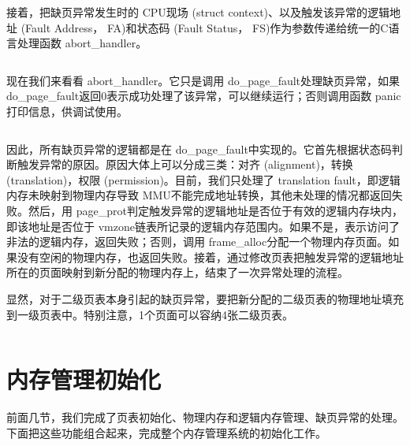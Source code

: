\documentclass[main.tex]{subfiles}
\begin{document}
\begin{CJK*}{UTF8}{song}
\par
接着，把缺页异常发生时的 CPU现场 (struct context)、以及触发该异常的逻辑地址 (Fault Address， FA)和状态码 (Fault Status， FS)作为参数传递给统一的C语言处理函数 abort\_\-handler。

\begin{code}
\label{code:4-19}
\inputminted[firstline=157,lastline=178,linenos,numbersep=5pt,frame=lines,framesep=2mm]{gas}{src/chapter04/kernel/entry.S}
\end{code}

现在我们来看看 abort\_\-handler。它只是调用 do\_\-page\_\-fault处理缺页异常，如果 do\_\-page\_\-fault返回0表示成功处理了该异常，可以继续运行；否则调用函数 panic打印信息，供调试使用。

\begin{code}
\label{code:4-20}
\inputminted[firstline=329,lastline=335,linenos,numbersep=5pt,frame=lines,framesep=2mm]{c}{src/chapter04/kernel/machdep.c}
\end{code}

因此，所有缺页异常的逻辑都是在 do\_\-page\_\-fault中实现的。它首先根据状态码判断触发异常的原因。原因大体上可以分成三类：对齐 (alignment)，转换 (translation)，权限 (permission)。目前，我们只处理了 translation fault，即逻辑内存未映射到物理内存导致 MMU不能完成地址转换，其他未处理的情况都返回失败。然后，用 page\_\-prot判定触发异常的逻辑地址是否位于有效的逻辑内存块内，即该地址是否位于 vm\-zone链表所记录的逻辑内存范围内。如果不是，表示访问了非法的逻辑内存，返回失败；否则，调用 frame\_\-alloc分配一个物理内存页面。如果没有空闲的物理内存，也返回失败。接着，通过修改页表把触发异常的逻辑地址所在的页面映射到新分配的物理内存上，结束了一次异常处理的流程。

\par
显然，对于二级页表本身引起的缺页异常，要把新分配的二级页表的物理地址填充到一级页表中。特别注意，1个页面可以容纳4张二级页表。

\begin{code}
\label{code:4-21}
\inputminted[firstline=256,lastline=327,linenos,numbersep=5pt,frame=lines,framesep=2mm]{c}{src/chapter04/kernel/machdep.c}
\end{code}

\section{内存管理初始化}
前面几节，我们完成了页表初始化、物理内存和逻辑内存管理、缺页异常的处理。下面把这些功能组合起来，完成整个内存管理系统的初始化工作。


\end{CJK*}
\end{document}
